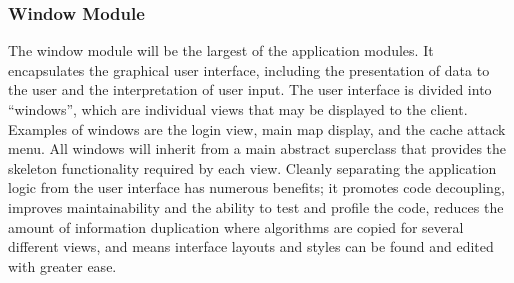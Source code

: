 \subsubsection{Window Module}
The window module will be the largest of the application modules. It encapsulates the graphical user interface, including the presentation of data to the user and the interpretation of user input. The user interface is divided into ``windows'', which are individual views that may be displayed to the client. Examples of windows are the login view, main map display, and the cache attack menu. All windows will inherit from a main abstract superclass that provides the skeleton functionality required by each view. Cleanly separating the application logic from the user interface has numerous benefits; it promotes code decoupling, improves maintainability and the ability to test and profile the code, reduces the amount of information duplication where algorithms are copied for several different views, and means interface layouts and styles can be found and edited with greater ease.

